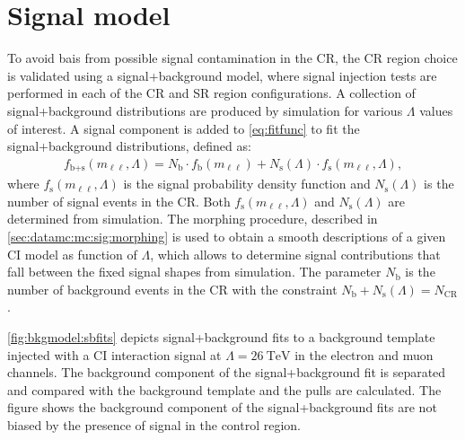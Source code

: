 \section{Signal model}\label{sec:sigmodel}
To avoid bais from possible signal contamination in the CR, the CR region choice is validated using a signal+background model, where signal injection tests are performed in each of the CR and SR region configurations. A collection of signal+background distributions are produced by simulation for various $\Lambda$ values of interest. A signal component is added to \cref{eq:fitfunc} to fit the signal+background distributions, defined as: 
\begin{equation}
    \label{eq:sbfunction}
    \begin{aligned}
    f_\textrm{b+s}(m_{\ell\ell},\Lambda) = N_\textrm{b}\cdot f_\textrm{b}(m_{\ell\ell}) + N_\textrm{s}(\Lambda)\cdot f_\textrm{s}(m_{\ell\ell},\Lambda),
    \end{aligned} 
\end{equation}
where $f_\textrm{s}(m_{\ell\ell},\Lambda)$ is the signal probability density function and $N_\textrm{s}(\Lambda)$ is the number of signal events in the CR. Both $f_\textrm{s}(m_{\ell\ell},\Lambda)$ and $N_\textrm{s}(\Lambda)$ are determined from simulation. The morphing procedure, described in \cref{sec:datamc:mc:sig:morphing} is used to obtain a smooth descriptions of a given CI model as function of $\Lambda$, which allows to determine signal contributions that fall between the fixed signal shapes from simulation. The parameter $N_\textrm{b}$ is the number of background events in the CR with the constraint $N_\textrm{b}+N_\textrm{s}(\Lambda)=N_\textrm{CR}$.  

\cref{fig:bkgmodel:sbfits} depicts signal+background fits to a background template injected with a CI interaction signal at $\Lambda = \SI{26}{\tera\electronvolt}$ in the electron and muon channels. The background component of the signal+background fit is separated and compared with the background template and the pulls are calculated. The figure shows the background component of the signal+background fits are not biased by the presence of signal in the control region. 

